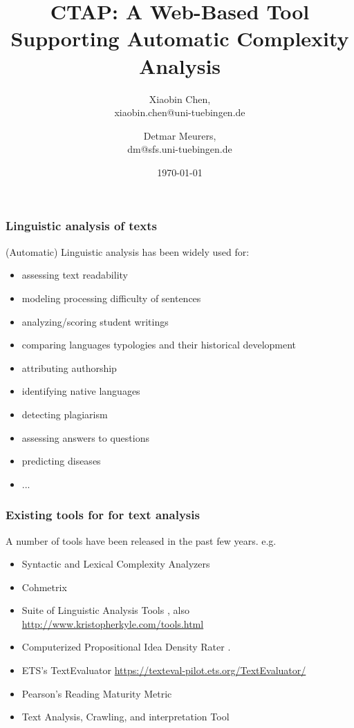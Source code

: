 \documentclass{beamer}
\title[CTAP Demo]{CTAP: A Web-Based Tool Supporting Automatic Complexity
Analysis}
\author[X.B. Chen \& D. Meurers]{Xiaobin Chen, \\
	xiaobin.chen@uni-tuebingen.de \\
	\and 
	Detmar Meurers, \\
	dm@sfs.uni-tuebingen.de
}
\institute[T\"ubingen]{T\"ubingen University}
\date{\today}
\begin{document}
	 \frame{\titlepage}

	\begin{frame}
		\frametitle{Linguistic analysis of texts}

		(Automatic) Linguistic analysis has been widely used for: 
		\begin{itemize}
			\item assessing text readability 
			\item modeling processing difficulty of sentences
			\item analyzing/scoring student writings
			\item comparing languages typologies and their historical development
			\item attributing authorship
			\item identifying native languages
			\item detecting plagiarism
			\item assessing answers to questions
			\item predicting diseases
			\item ...
		\end{itemize}
	\end{frame}


	\begin{frame}
		\frametitle{Existing tools for for text analysis}

		A number of tools have been released in the past few years. e.g.

		\begin{itemize}
			\item Syntactic and Lexical Complexity Analyzers \citep{Lu-10}
			\item Cohmetrix \citep{McNamara.ea-14}
			\item Suite of Linguistic Analysis Tools
			\citep{Crossley.ea-16a,Crossley.ea-16b}, also
			\url{http://www.kristopherkyle.com/tools.html}
			\item Computerized Propositional Idea Density Rater
			\citep[CPIDR]{Brown.ea-08}. 
			\item ETS's TextEvaluator
			\url{https://texteval-pilot.ets.org/TextEvaluator/}
			\item Pearson's Reading Maturity Metric
			\item Text Analysis, Crawling, and interpretation Tool
			\citep[TACIT]{Dehghani.ea-16}
		\end{itemize}
	\end{frame}
\end{document}
